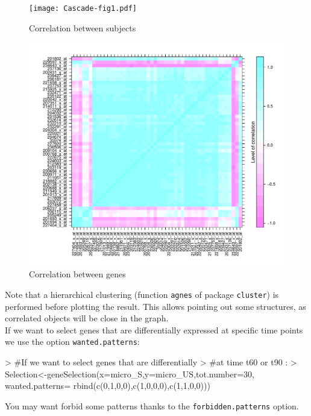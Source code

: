 \documentclass[a4paper]{article}
\begin{document}
\begin{figure}
\centering
\texttt{[image: Cascade-fig1.pdf]}
\caption{Correlation between subjects}\label{ind}
\includegraphics[clip=true,trim= 5mm 9mm 1mm 2mm]{Cascade-fig2.pdf}
\caption{Correlation between genes}\label{ind2}
\end{figure}
\restoregeometry



Note that a hierarchical clustering (function \texttt{agnes} of package \texttt{cluster}) is performed before plotting the result. This allows pointing out some structures, as correlated objects will be close in the graph. \\

If we want to select genes that are differentially expressed at specific time points we use the option \texttt{wanted.patterns}:


\begin{Schunk}
\begin{Sinput}
> #If we want to select genes that are differentially 
> #at time t60 or t90 :
> Selection<-geneSelection(x=micro_S,y=micro_US,tot.number=30,
   wanted.patterns=
   rbind(c(0,1,0,0),c(1,0,0,0),c(1,1,0,0)))
\end{Sinput}
\end{Schunk}

You may want forbid some patterns thanks to the \texttt{forbidden.patterns} option. \\
\end{document}
